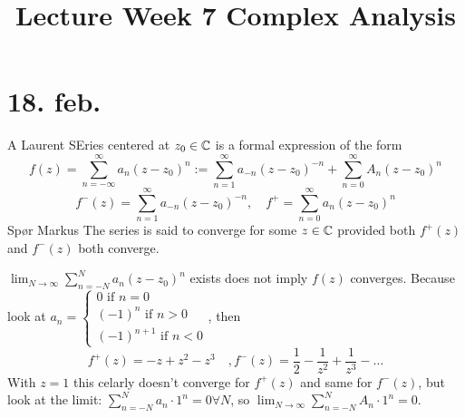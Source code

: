 \title{Lecture Week 7 Complex Analysis}
\maketitle
\section{18. feb.}
\begin{definition}
  A Laurent SEries centered at $z_0\in \mathbb{C}$ is a formal expression of the form
    $$f(z)=\sum_{n=-\infty}^{\infty}a_n(z-z_0)^n:=\sum_{n=1}^{\infty}a_{-n}(z-z_0)^{-n}+\sum_{n=0}^{\infty}A_{n}(z-z_0)^n$$
    $$f^{-}(z)= \sum_{n=1}^{\infty}a_{-n}(z-z_0)^{-n}, \quad f^{+}= \sum_{n=0}^{\infty}a_n(z-z_0)^{n}$$
    Spør Markus
    \newline The series is said to converge for some $z\in \mathbb{C}$ provided both $f^{+}(z)$ and $f^{-}(z)$ both converge.
\end{definition}

\begin{remark}
  $\lim_{N\to \infty}\sum_{n=-N}^{N}a_n(z-z_0)^n$ exists does not imply $f(z)$ converges.
  \newline Because look at $a_n =
      \begin{cases}
          0 \text{ if } n = 0 \\
          (-1)^n \text{ if } n >0 \\
          (-1)^{n+1} \text{ if } n<0
      \end{cases}$, then
        $$ f^{+}(z)=-z+z^{2}-z^{3} \quad, f^{-}(z) =\frac{1}{2}-\frac{1}{z^{2}}+\frac{1}{z^{3}}-\ldots $$
      With $z=1$ this celarly doesn't converge for $f^{+} (z)$ and same for $f^{-}(z)$, but look at the limit: $\sum_{n=-N}^{N}a_n \cdot 1^n=0 \forall N$, so $\lim_{N\to \infty}\sum_{n=-N}^{N} A_n \cdot 1^n = 0$.
\end{remark}

